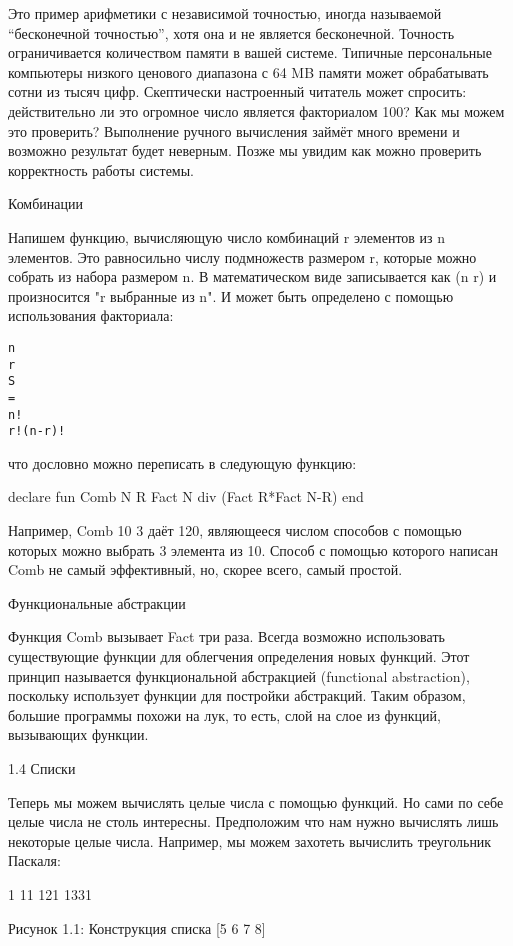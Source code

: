 Это пример арифметики с независимой точностью, иногда называемой ``бесконечной точностью'', хотя она и не является бесконечной. Точность ограничивается количеством памяти в вашей системе. Типичные персональные компьютеры низкого ценового диапазона с 64 MB памяти может обрабатывать сотни из тысяч цифр. Скептически настроенный читатель может спросить: действительно ли это огромное число является факториалом 100? Как мы можем это проверить? Выполнение ручного вычисления займёт много времени и возможно результат будет неверным. Позже мы увидим как можно проверить корректность работы системы.

Комбинации

Напишем функцию, вычисляющую число комбинаций r элементов из n элементов. Это равносильно числу подмножеств размером r, которые можно собрать из набора размером n. В математическом виде записывается как (n r) и произносится "r выбранные из n". И может быть определено с помощью использования факториала:

\begin{lstlisting}
n
r
S
=
n!
r!(n-r)!

\end{lstlisting}

что дословно можно переписать в следующую функцию:

declare
fun {Comb N R}
{Fact N} div ({Fact R}*{Fact N-R})
end

Например, {Comb 10 3} даёт 120, являющееся числом способов с помощью которых можно выбрать 3 элемента из 10. Способ с помощью которого написан Comb не самый эффективный, но, скорее всего, самый простой.

Функциональные абстракции

Функция Comb вызывает Fact три раза. Всегда возможно использовать существующие функции для облегчения определения новых функций. Этот принцип называется функциональной абстракцией (functional abstraction), поскольку использует функции для постройки абстракций. Таким образом, большие программы похожи на лук, то есть, слой на слое из функций, вызывающих функции.

1.4 Списки

Теперь мы можем вычислять целые числа с помощью функций. Но сами по себе целые числа не столь интересны. Предположим что нам нужно вычислять лишь некоторые целые числа. Например, мы можем захотеть вычислить треугольник Паскаля:

1
11
121
1331

Рисунок 1.1: Конструкция списка [5 6 7 8]

